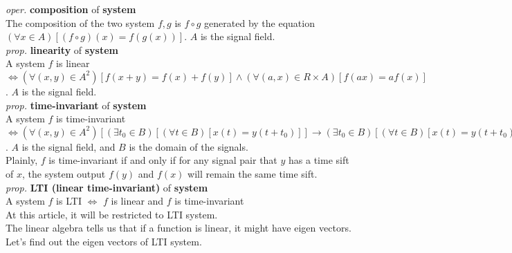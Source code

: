 \documentclass{article}
\newcommand{\sd}[1]{{\left(#1\right)}}
\newcommand{\md}[1]{{\left[#1\right]}}
\newcommand{\oper}[2]{\emph{oper.} \textbf{#1} of \textbf{#2}}
\newcommand{\prop}[2]{\emph{prop.} \textbf{#1} of \textbf{#2}}
\begin{document}
\oper{composition}{system}\\
The composition of the two system $f,g$ is $f\circ g$ generated by the equation $\sd{\forall x \in A}\md{\sd{f\circ g}\sd{x} = f\sd{g\sd{x}}}$. $A$ is the signal field.\\
\prop{linearity}{system}\\
A system $f$ is linear $\iff \sd{\forall \sd{x,y} \in A^2}\md{f\sd{x+y} = f\sd{x}+f\sd{y}}\land\sd{\forall \sd{a,x} \in R\times A}\md{f\sd{ax} = af\sd{x}}$. $A$ is the signal field.\\
\prop{time-invariant}{system}\\
A system $f$ is time-invariant $\iff \sd{\forall \sd{x,y} \in A^2}\md{\sd{\exists t_0 \in B}\md{\sd{\forall t \in B}\md{x\sd{t} = y\sd{t+t_0}}} \to \sd{\exists t_0 \in B}\md{\sd{\forall t \in B}\md{x\sd{t} = y\sd{t+t_0}}\land\sd{\forall t \in B}\md{\sd{f\sd{x}}\sd{t} = \sd{f\sd{y}}\sd{t+t_0}}}}$. $A$ is the signal field, and $B$ is the domain of the signals.\\
Plainly, $f$ is time-invariant if and only if for any signal pair that $y$ has a time sift of $x$, the system output $f\sd{y}$ and $f\sd{x}$ will remain the same time sift.\\
\prop{LTI (linear time-invariant)}{system}\\
A system $f$ is LTI $\iff$ $f$ is linear and $f$ is time-invariant\\
At this article, it will be restricted to LTI system.\\
The linear algebra tells us that if a function is linear, it might have eigen vectors. Let's find out the eigen vectors of LTI system.\\
\end{document}
